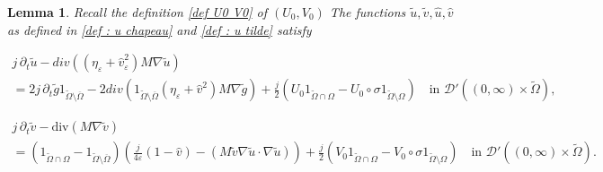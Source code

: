 \documentclass[10pt,a4paper]{amsart}
\newtheorem{lemma}{Lemma}
\begin{document}
\begin{lemma}
Recall the definition \eqref{def U0 V0} of $(U_0, V_0)$
The functions $\widetilde{u}, \widetilde{v}, \hat{u}, \hat{v}$ as defined in \eqref{def : u chapeau} and \eqref{def : u tilde} satisfy 

\begin{multline}\label{boundary : equ}
j\, \partial_t \widetilde{u} - div((\eta_\varepsilon + \hat{v}^2_\varepsilon ) M\nabla \widetilde{u} )\\
 = 2j\, \partial_t \widetilde{g} 1_{\widetilde{\Omega}\setminus \overline{\Omega}} - 2 div(1_{\widetilde{\Omega}\setminus \overline{\Omega}} (\eta_\varepsilon + \hat{v}^2) M \nabla \widetilde{g})+ \frac{j}{2}(U_0 1_{\widetilde{\Omega}\cap \Omega} - U_0\circ \sigma  1_{\widetilde{\Omega}\setminus \Omega}) \quad \text{in } \mathcal{D}'((0,\infty) \times \widetilde{\Omega}),
\end{multline}


\begin{multline}\label{boundary : eqv}
j\, \partial_t \widetilde{v} - \text{div}(M\nabla \widetilde{v})\\
 =(1_{\widetilde{\Omega} \cap \Omega} - 1_{\widetilde{\Omega}\setminus \overline{\Omega}}) \left( \frac{j}{4\varepsilon} (1-\hat{v}) - (M \widetilde{v} \nabla \widetilde{u} \cdot \nabla \widetilde{u})\right) + \frac{j}{2}(V_0 1_{\widetilde{\Omega}\cap \Omega} - V_0\circ \sigma  1_{\widetilde{\Omega}\setminus \Omega}) \quad \text{in } \mathcal{D}'((0,\infty) \times \widetilde{\Omega}).
\end{multline}
\end{lemma}
\end{document}
